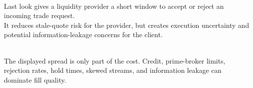\documentclass[a4paper,oneside,openany]{book}
\begin{document}
\begin{definition} \\
Last look gives a liquidity provider a short window to accept or reject an incoming trade request.\\
It reduces stale-quote risk for the provider, but creates execution uncertainty and potential information-leakage concerns for the client.
\end{definition}

\begin{caveat} \\
The displayed spread is only part of the cost. Credit, prime-broker limits, rejection rates, hold times, skewed streams, and information leakage can dominate fill quality.
\end{caveat}
\end{document}
